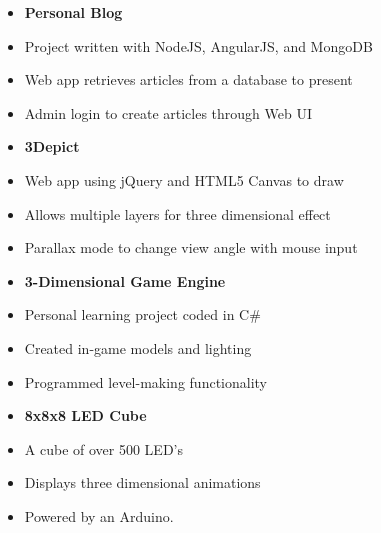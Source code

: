 \documentclass{article}
\begin{document}
\begin{minipage}[t]{0.5\textwidth}
  \vspace{0.5mm}
  \begin{itemize}[leftmargin=4mm]
    \item[] {\bf Personal Blog } \\[-0.5mm]   
    \item[] Project written with NodeJS, AngularJS, and MongoDB \\[-2mm]   
    \item[] Web app retrieves articles from a database to present \\[-2mm]   
    \item[] Admin login to create articles through Web UI \\[2mm]
    \item[] {\bf 3Depict } \\[-0.5mm]   
    \item[] Web app using jQuery and HTML5 Canvas to draw \\[-2mm]   
    \item[] Allows multiple layers for three dimensional effect \\[-2mm]   
    \item[] Parallax mode to change view angle with mouse input 
  \end{itemize}
\end{minipage}
\begin{minipage}[t]{0.5\textwidth}
  \vspace{0.5mm}
  \begin{itemize}[leftmargin=4mm]
    \item[] {\bf 3-Dimensional Game Engine } \\[-0.5mm]   
    \item[] Personal learning project coded in C\# \\[-2mm]   
    \item[] Created in-game models and lighting  \\[-2mm]   
    \item[] Programmed level-making functionality \\[2mm]
    \item[] {\bf 8x8x8 LED Cube } \\[-0.5mm]   
    \item[] A cube of over 500 LED's \\[-2mm]   
    \item[] Displays three dimensional animations \\[-2mm]   
    \item[] Powered by an Arduino. 
  \end{itemize}
\end{minipage}
\end{document}
